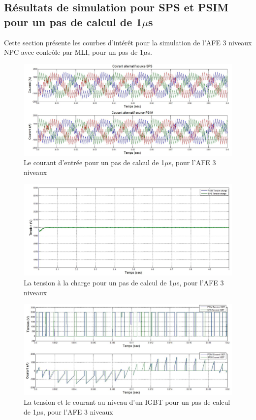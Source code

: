 \clearpage


\subsection{Résultats de simulation pour SPS et PSIM pour un pas de calcul de 1$\mu$s}
Cette section présente les courbes d'intérêt pour la simulation de l'AFE 3 niveaux NPC avec contrôle par MLI, pour un pas de 1$\mu$s. 

\begin{figure}[htb]
\centering
\includegraphics[scale=0.5]{fig/AFE3LEVEL/1u/cour_al.jpg}
\caption{Le courant d'entrée pour un pas de calcul de 1$\mu$s, pour l'AFE 3 niveaux}
\label{AF_3_cou}
\end{figure}


\begin{figure}[htb]
\centering
\includegraphics[scale=0.5]{fig/AFE3LEVEL/1u/vch.jpg}
\caption{La tension à la charge pour un pas de calcul de 1$\mu$s, pour l'AFE 3 niveaux}
\label{AF_3_vch}
\end{figure}


\begin{figure}[htb]
\centering
\includegraphics[scale=0.5]{fig/AFE3LEVEL/1u/IGBT.jpg}
\caption{La tension et le courant au niveau d'un IGBT pour un pas de calcul de 1$\mu$s, pour l'AFE 3 niveaux}
\label{AF_3_IGBT}
\end{figure}


